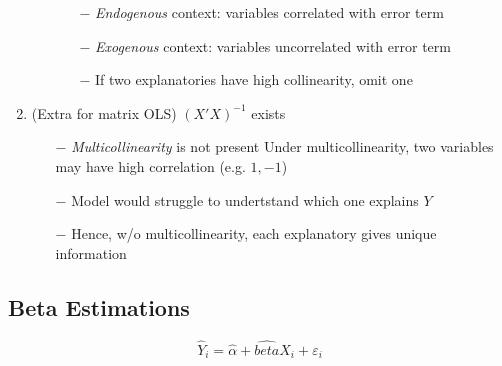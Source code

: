 \documentclass[11pt, english]{article}
\begin{document}
\begin{enumerate}
\begin{enumerate}
\begin{enumerate}
				\item[$-$] \textit{Endogenous} context: variables correlated with error term 
				\item[$-$] \textit{Exogenous} context: variables uncorrelated with error term
				\item[$-$] If two explanatories have high collinearity, omit one
			\end{enumerate}
		\end{enumerate}
		\item (Extra for matrix OLS) $(X'X)^{-1}$ exists
		\begin{enumerate}
			\item[$-$] \textit{Multicollinearity} is not present
				Under multicollinearity, two variables may have high correlation (e.g. $1,-1$)
			\item[$-$] Model would struggle to undertstand which one explains $Y$
			\item[$-$] Hence, w/o multicollinearity, each explanatory gives unique information
		\end{enumerate}
	\end{enumerate}

	\newpage

	\subsection{Beta Estimations}

	$$\hat{Y}_i=\hat{\alpha}+\hat{beta}X_i+\varepsilon_i$$
\end{document}
